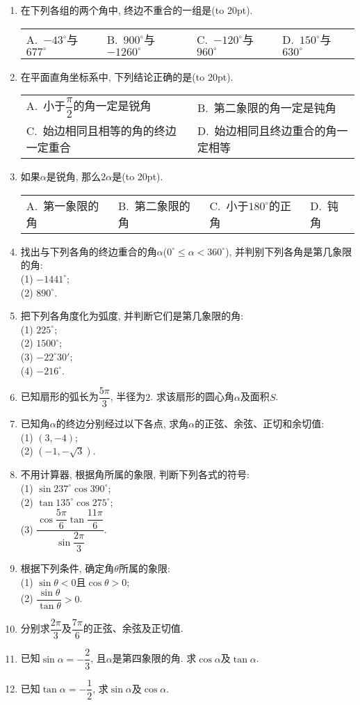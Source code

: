 \documentclass[10pt,a4paper]{article}
\newcommand{\bracket}[1]{(\hbox to #1pt{})}
\newcommand{\twoch}[4]{\par\begin{tabular}{p{.46\textwidth}p{.46\textwidth}}
A.~#1& B.~#2\\
C.~#3& D.~#4
\end{tabular}}
\newcommand{\fourch}[4]{\par\begin{tabular}{p{.23\textwidth}p{.23\textwidth}p{.23\textwidth}p{.23\textwidth}}
A.~#1 &B.~#2& C.~#3& D.~#4
\end{tabular}}
\begin{document}
\begin{enumerate}[1.]

\item 在下列各组的两个角中, 终边不重合的一组是\bracket{20}.
\fourch{$-43^\circ$与$677^\circ$}{$900^\circ$与$-1260^\circ$}{$-120^\circ$与$960^\circ$}{$150^\circ$与$630^\circ$}
\item 在平面直角坐标系中, 下列结论正确的是\bracket{20}.
\twoch{小于$\dfrac \pi 2$的角一定是锐角}{第二象限的角一定是钝角}{始边相同且相等的角的终边一定重合}{始边相同且终边重合的角一定相等}
\item 如果$\alpha$是锐角, 那么$2\alpha$是\bracket{20}.
\fourch{第一象限的角}{第二象限的角}{小于$180^\circ$的正角}{钝角}
\item 找出与下列各角的终边重合的角$\alpha$($0^\circ \le \alpha<360^\circ$), 并判别下列各角是第几象限的角:\\
(1) $-1441^\circ$;\\
(2) $890^\circ$.
\item 把下列各角度化为弧度, 并判断它们是第几象限的角:\\
(1) $225^\circ$;\\
(2) $1500^\circ$;\\
(3) $-22^\circ 30'$;\\
(4) $-216^\circ$.
\item 已知扇形的弧长为$\dfrac{5\pi} 3$, 半径为$2$. 求该扇形的圆心角$\alpha$及面积$S$.
\item 已知角$\alpha$的终边分别经过以下各点, 求角$\alpha$的正弦、余弦、正切和余切值:\\
(1) $(3, -4)$;\\
(2) $(-1, -\sqrt 3)$.
\item 不用计算器, 根据角所属的象限, 判断下列各式的符号:\\
(1) $\sin 237^\circ \cos 390^\circ$;\\
(2) $\tan 135^\circ \cos 275^\circ$;\\
(3) $\dfrac{\cos \dfrac{5\pi} 6\tan \dfrac{11\pi} 6}{\sin \dfrac{2\pi} 3}$.
\item 根据下列条件, 确定角$\theta$所属的象限:\\
(1) $\sin \theta <0$且$\cos \theta >0$;\\
(2) $\dfrac{\sin \theta}{\tan \theta} >0$.
\item 分别求$\dfrac{2\pi} 3$及$\dfrac{7\pi} 6$的正弦、余弦及正切值.
\item 已知$\sin \alpha=-\dfrac 23$, 且$\alpha$是第四象限的角. 求$\cos \alpha$及$\tan \alpha$.
\item 已知$\tan \alpha=-\dfrac 12$, 求$\sin \alpha$及$\cos \alpha$.

\end{enumerate}
\end{document}
